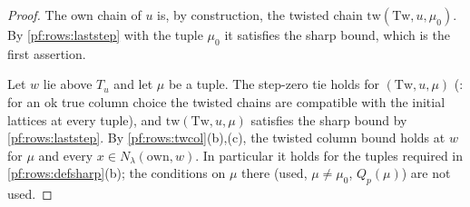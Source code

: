 \begin{proof}
The own chain of $u$ is, by construction, the twisted chain $\mathrm{tw}(\mathrm{Tw},u,\mu_0)$. By \cref{pf:rows:laststep} with
the tuple $\mu_0$ it satisfies the sharp bound, which is the first assertion.

Let $w$ lie above $T_u$ and let $\mu$ be a tuple. The step-zero tie holds for $(\mathrm{Tw},u,\mu)$
(: for an ok true column choice the twisted
chains are compatible with the initial lattices at every tuple), and $\mathrm{tw}(\mathrm{Tw},u,\mu)$ satisfies the sharp bound by
\cref{pf:rows:laststep}. By \cref{pf:rows:twcol}(b),(c), the twisted column bound holds at $w$ for $\mu$ and every
$x\in N_\lambda(\mathrm{own},w)$. In particular it holds for the tuples required in \cref{pf:rows:defsharp}(b); the
conditions on $\mu$ there (used, $\mu\ne\mu_0$, $Q_p(\mu)$) are not used.
\end{proof}

